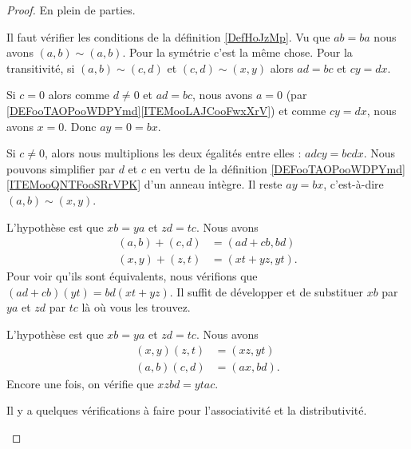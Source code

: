 \begin{proof}
	En plein de parties.
	\begin{subproof}
		Il faut vérifier les conditions de la définition \ref{DefHoJzMp}. Vu que \( ab=ba\) nous avons \( (a,b)\sim (a,b)\). Pour la symétrie c'est la même chose. Pour la transitivité, si \( (a,b)\sim(c,d)\) et \( (c,d)\sim(x,y)\) alors \( ad=bc\) et \( cy=dx\).

		Si \( c=0\) alors comme \( d\neq 0\) et \( ad=bc\), nous avons \( a=0\) (par \ref{DEFooTAOPooWDPYmd}\ref{ITEMooLAJCooFwxXrV}) et comme \( cy=dx\), nous avons \( x=0\). Donc \( ay=0=bx\).

		Si \( c\neq 0\), alors nous multiplions les deux égalités entre elles : \( adcy=bcdx\). Nous pouvons simplifier par \( d\) et \( c\) en vertu de la définition \ref{DEFooTAOPooWDPYmd}\ref{ITEMooQNTFooSRrVPK} d'un anneau intègre. Il reste \( ay=bx\), c'est-à-dire \( (a,b)\sim(x,y)\).

		L'hypothèse est que \( xb=ya\) et \( zd=tc\). Nous avons
		\begin{subequations}
			\begin{align}
				(a,b)+(c,d) & =(ad+cb,bd)  \\
				(x,y)+(z,t) & =(xt+yz,yt).
			\end{align}
		\end{subequations}
		Pour voir qu'ils sont équivalents, nous vérifions que \( (ad+cb)(yt)=bd(xt+yz)\). Il suffit de développer et de substituer \( xb\) par \( ya\) et \( zd\) par \( tc\) là où vous les trouvez.

		L'hypothèse est que \( xb=ya\) et \( zd=tc\). Nous avons
		\begin{subequations}
			\begin{align}
				(x,y)(z,t) & =(xz,yt)  \\
				(a,b)(c,d) & =(ax,bd).
			\end{align}
		\end{subequations}
		Encore une fois, on vérifie que \( xzbd=ytac\).

		Il y a quelques vérifications à faire pour l'associativité et la distributivité.


\end{subproof}
\end{proof}
